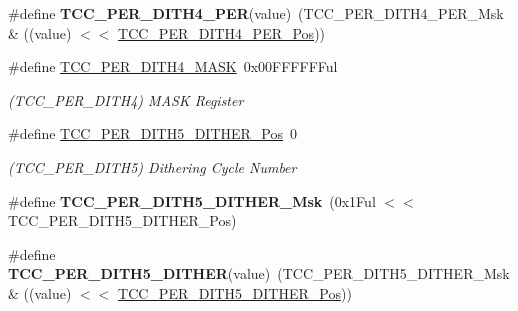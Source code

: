\begin{DoxyCompactItemize}
\item 
\hypertarget{group___s_a_m_l21___t_c_c_ga19dcfe8f8f169bb6ce2b0aa5f413bc2d}{}\#define {\bfseries T\+C\+C\+\_\+\+P\+E\+R\+\_\+\+D\+I\+T\+H4\+\_\+\+P\+E\+R}(value)~(T\+C\+C\+\_\+\+P\+E\+R\+\_\+\+D\+I\+T\+H4\+\_\+\+P\+E\+R\+\_\+\+Msk \& ((value) $<$$<$ \hyperlink{group___s_a_m_l21___t_c_c_ga0199ba19718807ae1fb73141bea0243e}{T\+C\+C\+\_\+\+P\+E\+R\+\_\+\+D\+I\+T\+H4\+\_\+\+P\+E\+R\+\_\+\+Pos}))\label{group___s_a_m_l21___t_c_c_ga19dcfe8f8f169bb6ce2b0aa5f413bc2d}

\item 
\hypertarget{group___s_a_m_l21___t_c_c_gae6905e58e9a3221693ad0cf4c3ae551d}{}\#define \hyperlink{group___s_a_m_l21___t_c_c_gae6905e58e9a3221693ad0cf4c3ae551d}{T\+C\+C\+\_\+\+P\+E\+R\+\_\+\+D\+I\+T\+H4\+\_\+\+M\+A\+S\+K}~0x00\+F\+F\+F\+F\+F\+Ful\label{group___s_a_m_l21___t_c_c_gae6905e58e9a3221693ad0cf4c3ae551d}

\begin{DoxyCompactList}\small\item\em (T\+C\+C\+\_\+\+P\+E\+R\+\_\+\+D\+I\+T\+H4) M\+A\+S\+K Register \end{DoxyCompactList}\item 
\hypertarget{group___s_a_m_l21___t_c_c_ga9fe062d0ef26ee2d35e575f078268317}{}\#define \hyperlink{group___s_a_m_l21___t_c_c_ga9fe062d0ef26ee2d35e575f078268317}{T\+C\+C\+\_\+\+P\+E\+R\+\_\+\+D\+I\+T\+H5\+\_\+\+D\+I\+T\+H\+E\+R\+\_\+\+Pos}~0\label{group___s_a_m_l21___t_c_c_ga9fe062d0ef26ee2d35e575f078268317}

\begin{DoxyCompactList}\small\item\em (T\+C\+C\+\_\+\+P\+E\+R\+\_\+\+D\+I\+T\+H5) Dithering Cycle Number \end{DoxyCompactList}\item 
\hypertarget{group___s_a_m_l21___t_c_c_ga8d74a38d8c8f7e8c41a50643c32036be}{}\#define {\bfseries T\+C\+C\+\_\+\+P\+E\+R\+\_\+\+D\+I\+T\+H5\+\_\+\+D\+I\+T\+H\+E\+R\+\_\+\+Msk}~(0x1\+Ful $<$$<$ T\+C\+C\+\_\+\+P\+E\+R\+\_\+\+D\+I\+T\+H5\+\_\+\+D\+I\+T\+H\+E\+R\+\_\+\+Pos)\label{group___s_a_m_l21___t_c_c_ga8d74a38d8c8f7e8c41a50643c32036be}

\item 
\hypertarget{group___s_a_m_l21___t_c_c_ga08c5e54cbcfb8e1c0932fcd3d6e908d5}{}\#define {\bfseries T\+C\+C\+\_\+\+P\+E\+R\+\_\+\+D\+I\+T\+H5\+\_\+\+D\+I\+T\+H\+E\+R}(value)~(T\+C\+C\+\_\+\+P\+E\+R\+\_\+\+D\+I\+T\+H5\+\_\+\+D\+I\+T\+H\+E\+R\+\_\+\+Msk \& ((value) $<$$<$ \hyperlink{group___s_a_m_l21___t_c_c_ga9fe062d0ef26ee2d35e575f078268317}{T\+C\+C\+\_\+\+P\+E\+R\+\_\+\+D\+I\+T\+H5\+\_\+\+D\+I\+T\+H\+E\+R\+\_\+\+Pos}))\label{group___s_a_m_l21___t_c_c_ga08c5e54cbcfb8e1c0932fcd3d6e908d5}


\end{DoxyCompactItemize}
